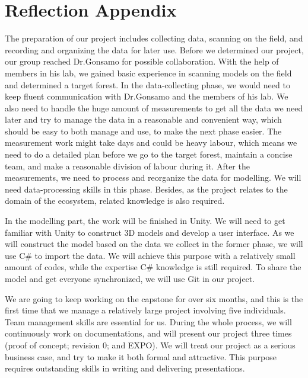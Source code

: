 \documentclass{article}
\begin{document}
\section{Reflection Appendix}

The preparation of our project includes collecting data, scanning on the field, and recording and organizing the data for later use. Before we determined our project, our group reached Dr.Gonsamo for possible collaboration. With the help of members in his lab, we gained basic experience in scanning models on the field and determined a target forest. In the data-collecting phase, we would need to keep fluent communication with Dr.Gonsamo and the members of his lab. We also need to handle the huge amount of measurements to get all the data we need later and try to manage the data in a reasonable and convenient way, which should be easy to both manage and use, to make the next phase easier. The measurement work might take days and could be heavy labour, which means we need to do a detailed plan before we go to the target forest, maintain a concise team, and make a reasonable division of labour during it. After the measurements, we need to process and reorganize the data for modelling. We will need data-processing skills in this phase. Besides, as the project relates to the domain of the ecosystem, related knowledge is also required. 

In the modelling part, the work will be finished in Unity. We will need to get familiar with Unity to construct 3D models and develop a user interface. As we will construct the model based on the data we collect in the former phase, we will use C\# to import the data. We will achieve this purpose with a relatively small amount of codes, while the expertise C\# knowledge is still required. To share the model and get everyone synchronized, we will use Git in our project. 

We are going to keep working on the capstone for over six months, and this is the first time that we manage a relatively large project involving five individuals. Team management skills are essential for us. During the whole process, we will continuously work on documentations, and will present our project three times (proof of concept; revision 0; and EXPO). We will treat our project as a serious business case, and try to make it both formal and attractive. This purpose requires outstanding skills in writing and delivering presentations. 
\end{document}
